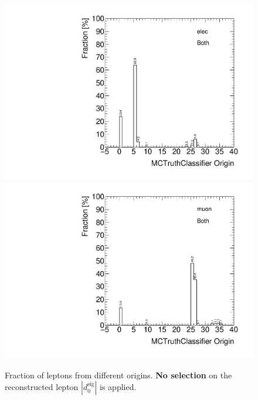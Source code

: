 \begin{figure}[!htbp]
\begin{center}

\includegraphics[scale=0.33]{./figures/boosted/FakeLeptons/JZXW_Origin_elec_Both}
\includegraphics[scale=0.33]{./figures/boosted/FakeLeptons/JZXW_Origin_muon_Both}
\caption{Fraction of leptons from different origins. \textbf{No selection} on the reconstructed lepton $|d_{0}^{\textrm{sig}}|$ is applied.}
\label{fig:boosted_fakeorigin_nocut}
\end{center}
\end{figure}
